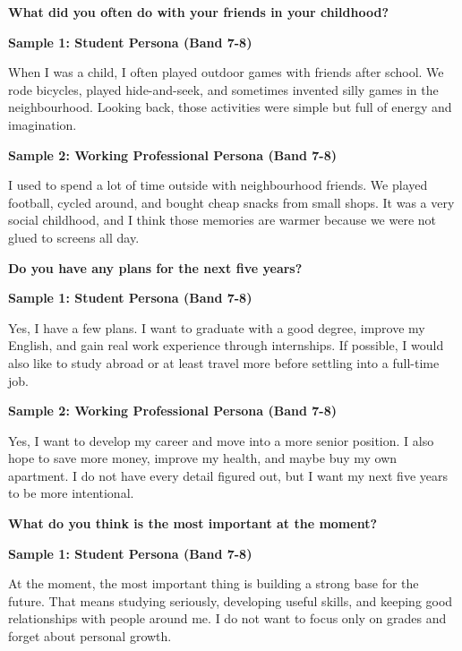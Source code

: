 \separator

\begin{ieltsquestion}
\textbf{What did you often do with your friends in your childhood?}
\end{ieltsquestion}
\textbf{Sample 1: Student Persona (Band 7-8)}

When I was a child, I often played outdoor games with friends after school. We rode bicycles, played hide-and-seek, and sometimes invented silly games in the neighbourhood. Looking back, those activities were simple but full of energy and imagination.

\textbf{Sample 2: Working Professional Persona (Band 7-8)}

I used to spend a lot of time outside with neighbourhood friends. We played football, cycled around, and bought cheap snacks from small shops. It was a very social childhood, and I think those memories are warmer because we were not glued to screens all day.

\separator

\begin{ieltsquestion}
\textbf{Do you have any plans for the next five years?}
\end{ieltsquestion}
\textbf{Sample 1: Student Persona (Band 7-8)}

Yes, I have a few plans. I want to graduate with a good degree, improve my English, and gain real work experience through internships. If possible, I would also like to study abroad or at least travel more before settling into a full-time job.

\textbf{Sample 2: Working Professional Persona (Band 7-8)}

Yes, I want to develop my career and move into a more senior position. I also hope to save more money, improve my health, and maybe buy my own apartment. I do not have every detail figured out, but I want my next five years to be more intentional.

\separator

\begin{ieltsquestion}
\textbf{What do you think is the most important at the moment?}
\end{ieltsquestion}
\textbf{Sample 1: Student Persona (Band 7-8)}

At the moment, the most important thing is building a strong base for the future. That means studying seriously, developing useful skills, and keeping good relationships with people around me. I do not want to focus only on grades and forget about personal growth.

